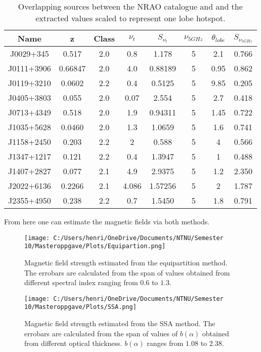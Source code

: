 \begin{table}
    \centering
    \begin{tabular}{|c|c|c|c|c|c|c|c|}
    \hline
    \textbf{Name} & \textbf{z} & \textbf{Class} & \textbf{$\nu_t$} & \textbf{$S_{\nu_t}$} & \textbf{$\nu_{5GHz}$} & \textbf{$\theta_{lobe}$} & \textbf{$S_{\nu_{5GHz}}$} \\
    \hline
    J0029+345 & 0.517 & 2.0 & 0.8 & 1.178 & 5 & 2.1 & 0.766 \\
    J0111+3906 & 0.66847 & 2.0 & 4.0 & 0.88189 & 5 & 0.95 & 0.862 \\
    J0119+3210 & 0.0602 & 2.2 & 0.4 & 0.5125 & 5 & 9.85 & 0.205 \\
    J0405+3803 & 0.055 & 2.0 & 0.07 & 2.554 & 5 & 2.7 & 0.418 \\
    J0713+4349 & 0.518 & 2.0 & 1.9 & 0.94311 & 5 & 1.45 & 0.722 \\
    J1035+5628 & 0.0460 & 2.0 & 1.3 & 1.0659 & 5 & 1.6 & 0.741 \\
    J1158+2450 & 0.203 & 2.2 & 2 & 0.588 & 5 & 4 & 0.566 \\
    J1347+1217 & 0.121 & 2.2 & 0.4 & 1.3947 & 5 & 1 & 0.488 \\
    J1407+2827 & 0.077 & 2.1 & 4.9 & 2.9375 & 5 & 1.2 & 2.350 \\
    J2022+6136 & 0.2266 & 2.1 & 4.086 & 1.57256 & 5 & 2 & 1.787 \\
    J2355+4950 & 0.238 & 2.2 & 0.7 & 1.5450 & 5 & 1.8 & 0.791 \\
    \hline
    \end{tabular}
    \caption{Overlapping sources between the NRAO catalogue and \cite{kiehlmann2023compact} and the extracted values scaled to represent one lobe hotspot.}
    \label{tab:CSO_B}
\end{table}

From here one can estimate the magnetic fields via both methods. 

\begin{figure}
    \centering
    \texttt{[image: C:/Users/henri/OneDrive/Documents/NTNU/Semester 10/Masteroppgave/Plots/Equipartion.png]}
    \caption{Magnetic field strength estimated from the equipartition method. The errobars are calculated from the span of values obtained from different spectral index ranging from $0.6$ to $1.3$.}
    \label{fig:B_field}
\end{figure}

\begin{figure}
    \centering
    \texttt{[image: C:/Users/henri/OneDrive/Documents/NTNU/Semester 10/Masteroppgave/Plots/SSA.png]}
    \caption{Magnetic field strength estimated from the SSA method. The errobars are calculated from the span of values of $b(\alpha)$ obtained from different optical thickness. $b(\alpha)$ ranges from $1.08$ to $2.38$.}
    \label{fig:B_field_SSA}
\end{figure}

